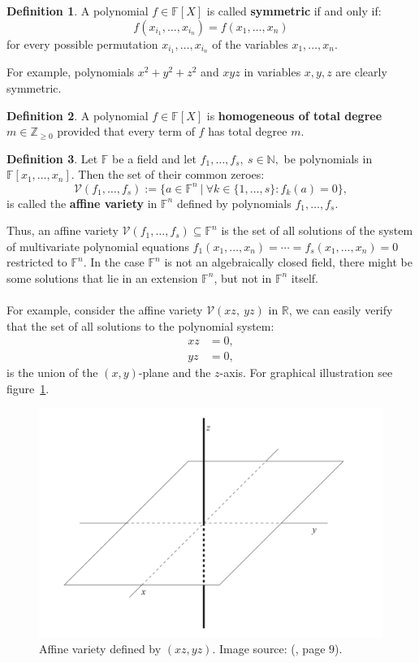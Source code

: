 \documentclass[thesis=M,english]{FITthesis}[2012/10/20]
\theoremstyle{remark}
\theoremstyle{definition}
\newtheorem{DF}{Definition}[section]
\begin{document}
\begin{DF}
A polynomial $f \in \mathbb{F}[X]$ is called \textbf{symmetric} if and only if:
$$
f(x_{i_1}, \ldots, x_{i_n}) = f(x_1, \ldots, x_n)
$$
for every possible permutation $x_{i_1}, \ldots, x_{i_n}$ of the variables $x_1, \ldots, x_n$.
\end{DF}
\noindent For example, polynomials $x^2+y^2+z^2$ and $xyz$ in variables $x,y,z$ are clearly symmetric.
\begin{DF}
A polynomial $f \in \mathbb{F}[X]$ is \textbf{homogeneous of total degree} $m \in \mathbb{Z}_{\geq 0}$ provided that every term of $f$ has total degree $m$.
\end{DF}
\begin{DF}
Let $\mathbb{F}$ be a field and let $f_1, \ldots, f_s,\ s \in \mathbb{N},$ be polynomials in $\mathbb{F}[x_1,\ldots, x_n].$ Then the set of their common zeroes:
$$
\mathcal{V}(f_1, \ldots, f_s) := \{a \in \mathbb{F}^n\ |\ \forall k \in \{1,\ldots,s\}: f_k(a) =  0\},
$$
is called the \textbf{affine variety} in $\mathbb{F}^n$ defined by polynomials $f_1, \ldots, f_s$.
\end{DF}
\noindent Thus, an affine variety $\mathcal{V}(f_1, \ldots, f_s) \subseteq \mathbb{F}^n$ is the set of all solutions of the system of multivariate polynomial equations $f_1(x_1,\ldots,x_n) = \cdots = f_s(x_1,\ldots,x_n) = 0$ restricted to $\mathbb{F}^n$. In the case $\mathbb{F}^n$ is not an algebraically closed field, there might be some solutions that lie in an extension $\mathbb{F}^n$, but not in $\mathbb{F}^n$ itself.\\ \\
\noindent For example, consider the affine variety $\mathcal{V}(xz,\ yz)$ in $\mathbb{R}$, we can easily verify that the set of all solutions to the polynomial system:
\begin{align*}
xz &= 0, \\
yz& = 0,
\end{align*}
is the union of the $(x,y)$-plane and the $z$-axis. For graphical illustration see figure~\ref{fig1}.
 \begin{figure}[h]
 \centering
 	\includegraphics[width=1.0\textwidth]{affineVariety.png}
 	\caption[Example of an affine variety]{Affine variety defined by $(xz,yz)$. Image source: (\cite{algGeom}, page $9$).}
 	\label{fig1}
 \end{figure}
\end{document}
